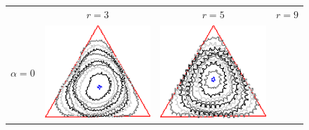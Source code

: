 \begin{figure}
\center
\begin{tabular}{p{2.5em}ccc}
& $r=3$ & $r=5$ & $r=9$ \\[2em]
\multirow{2}{*}{$\alpha=0$}& \includegraphics[scale=0.25]{figures/chapter6/radius-effect/triangle/improve/len_pen0/radius-3/summary.pdf} &
\includegraphics[scale=0.23]{figures/chapter6/radius-effect/triangle/improve/len_pen0/radius-5/summary.pdf} &

\end{tabular}
\end{figure}
